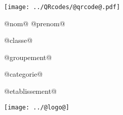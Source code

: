 \Huge

\begin{block} %
{}\hfill {}



\vspace{1cm}


\begin{minipage}{0.3\linewidth}
\texttt{[image: ../QRcodes/@qrcode@.pdf]}
\end{minipage}
{}\hfill {}
\begin{minipage}{0.33\linewidth}
{}\hfill {}
{}\hfill {}


\begin{center}
	@nom@ @prenom@
	
	@classe@
	
	@groupement@
	
	@categorie@
	
	@etablissement@
\end{center}

	

\end{minipage}
{}\hfill {}
\begin{minipage}{0.2\linewidth}
	\texttt{[image: ../@logo@]}
\end{minipage}
{}\hfill {}



\end{block}

\vfill


\vfill
